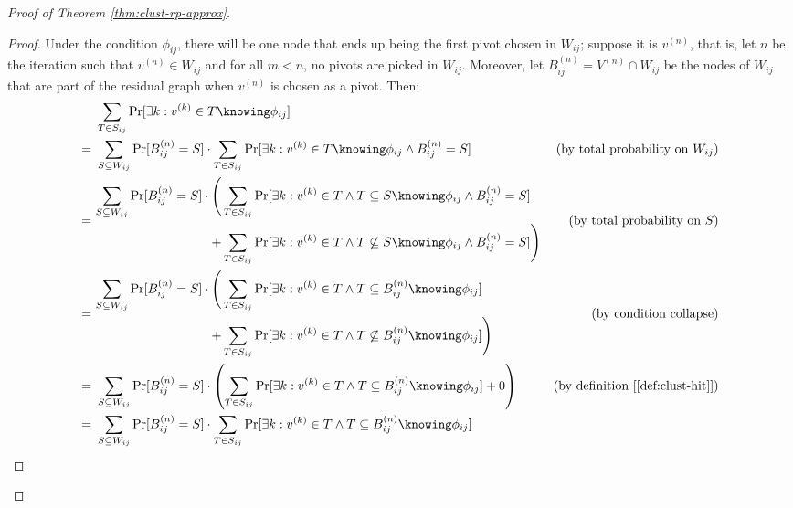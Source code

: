\begin{proof}[Proof of Theorem \ref{thm:clust-rp-approx}]
\begin{proof}
        Under the condition $\phi_{ij}$, there will be one node that ends up being the first pivot chosen in $W_{ij}$; suppose it is $v^{(n)}$, that is, let $n$ be the iteration such that $v^{(n)} \in W_{ij}$ and for all $m < n$, no pivots are picked in $W_{ij}$. Moreover, let $B^{(n)}_{ij} = V^{(n)} \cap W_{ij}$ be the nodes of $W_{ij}$ that are part of the residual graph when $v^{(n)}$ is chosen as a pivot. Then:
        \begin{align*}
                &\ \sum_{T \in S_{ij}} \Pr[\exists k : v^{(k)} \in T \knowing \phi_{ij}] & \\
               =&\ \sum_{S \subseteq W_{ij}} \Pr[B^{(n)}_{ij} = S] \cdot \sum_{T \in S_{ij}} \Pr[\exists k : v^{(k)} \in T \knowing \phi_{ij} \wedge B^{(n)}_{ij} = S] & \text{(by total probability on $W_{ij}$)} \\
               =&\ \begin{aligned}
                \sum_{S \subseteq W_{ij}} \Pr[B^{(n)}_{ij} = S] \cdot \Biggl( & \sum_{T \in S_{ij}} \Pr[\exists k : v^{(k)} \in T \wedge T \subseteq S \knowing \phi_{ij} \wedge B^{(n)}_{ij} = S] \\ + & \sum_{T \in S_{ij}} \Pr[\exists k : v^{(k)} \in T \wedge T \not\subseteq S \knowing \phi_{ij} \wedge B^{(n)}_{ij} = S] \Biggr)
               \end{aligned} & \text{(by total probability on $S$)} \\
               =&\ \begin{aligned}
                \sum_{S \subseteq W_{ij}} \Pr[B^{(n)}_{ij} = S] \cdot \Biggl( & \sum_{T \in S_{ij}} \Pr[\exists k : v^{(k)} \in T \wedge T \subseteq B^{(n)}_{ij} \knowing \phi_{ij}] \\ + & \sum_{T \in S_{ij}} \Pr[\exists k : v^{(k)} \in T \wedge T \not\subseteq B^{(n)}_{ij} \knowing \phi_{ij}] \Biggr)
               \end{aligned} & \text{(by condition collapse)} \\
               =&\ \sum_{S \subseteq W_{ij}} \Pr[B^{(n)}_{ij} = S] \cdot \left(\sum_{T \in S_{ij}} \Pr[\exists k : v^{(k)} \in T \wedge T \subseteq B^{(n)}_{ij} \knowing \phi_{ij}] + 0 \right) & \text{(by definition [\ref{def:clust-hit}])} \\ %
               =&\ \sum_{S \subseteq W_{ij}} \Pr[B^{(n)}_{ij} = S] \cdot \sum_{T \in S_{ij}} \Pr[\exists k : v^{(k)} \in T \wedge T \subseteq B^{(n)}_{ij} \knowing \phi_{ij}] & \\

\end{align*}
\end{proof}
\end{proof}
